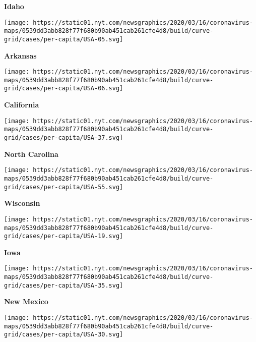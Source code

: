 \textbf{Idaho}

\href{https://www.nytimes.com/interactive/2020/us/arkansas-coronavirus-cases.html}{}

\texttt{[image: https://static01.nyt.com/newsgraphics/2020/03/16/coronavirus-maps/0539dd3abb828f77f680b90ab451cab261cfe4d8/build/curve-grid/cases/per-capita/USA-05.svg]}

\textbf{Arkansas}

\href{https://www.nytimes.com/interactive/2020/us/california-coronavirus-cases.html}{}

\texttt{[image: https://static01.nyt.com/newsgraphics/2020/03/16/coronavirus-maps/0539dd3abb828f77f680b90ab451cab261cfe4d8/build/curve-grid/cases/per-capita/USA-06.svg]}

\textbf{California}

\href{https://www.nytimes.com/interactive/2020/us/north-carolina-coronavirus-cases.html}{}

\texttt{[image: https://static01.nyt.com/newsgraphics/2020/03/16/coronavirus-maps/0539dd3abb828f77f680b90ab451cab261cfe4d8/build/curve-grid/cases/per-capita/USA-37.svg]}

\textbf{North Carolina}

\href{https://www.nytimes.com/interactive/2020/us/wisconsin-coronavirus-cases.html}{}

\texttt{[image: https://static01.nyt.com/newsgraphics/2020/03/16/coronavirus-maps/0539dd3abb828f77f680b90ab451cab261cfe4d8/build/curve-grid/cases/per-capita/USA-55.svg]}

\textbf{Wisconsin}

\href{https://www.nytimes.com/interactive/2020/us/iowa-coronavirus-cases.html}{}

\texttt{[image: https://static01.nyt.com/newsgraphics/2020/03/16/coronavirus-maps/0539dd3abb828f77f680b90ab451cab261cfe4d8/build/curve-grid/cases/per-capita/USA-19.svg]}

\textbf{Iowa}

\href{https://www.nytimes.com/interactive/2020/us/new-mexico-coronavirus-cases.html}{}

\texttt{[image: https://static01.nyt.com/newsgraphics/2020/03/16/coronavirus-maps/0539dd3abb828f77f680b90ab451cab261cfe4d8/build/curve-grid/cases/per-capita/USA-35.svg]}

\textbf{New Mexico}

\href{https://www.nytimes.com/interactive/2020/us/montana-coronavirus-cases.html}{}

\texttt{[image: https://static01.nyt.com/newsgraphics/2020/03/16/coronavirus-maps/0539dd3abb828f77f680b90ab451cab261cfe4d8/build/curve-grid/cases/per-capita/USA-30.svg]}

